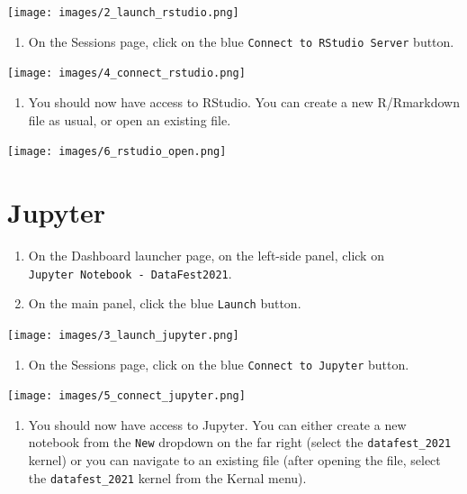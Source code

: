 \documentclass[]{book}
\providecommand{\tightlist}{%
  \setlength{\itemsep}{0pt}\setlength{\parskip}{0pt}}
\begin{document}
\texttt{[image: images/2\_launch\_rstudio.png]}

\begin{enumerate}
\def\labelenumi{\arabic{enumi}.}
\setcounter{enumi}{3}
\tightlist
\item
  On the Sessions page, click on the blue \texttt{Connect\ to\ RStudio\ Server} button.
\end{enumerate}

\texttt{[image: images/4\_connect\_rstudio.png]}

\begin{enumerate}
\def\labelenumi{\arabic{enumi}.}
\setcounter{enumi}{4}
\tightlist
\item
  You should now have access to RStudio. You can create a new R/Rmarkdown file as usual, or open an existing file.
\end{enumerate}

\texttt{[image: images/6\_rstudio\_open.png]}

\hypertarget{jupyter}{%
\section{Jupyter}\label{jupyter}}

\begin{enumerate}
\def\labelenumi{\arabic{enumi}.}
\setcounter{enumi}{1}
\tightlist
\item
  On the Dashboard launcher page, on the left-side panel, click on \texttt{Jupyter\ Notebook\ -\ DataFest2021}.
\item
  On the main panel, click the blue \texttt{Launch} button.
\end{enumerate}

\texttt{[image: images/3\_launch\_jupyter.png]}

\begin{enumerate}
\def\labelenumi{\arabic{enumi}.}
\setcounter{enumi}{3}
\tightlist
\item
  On the Sessions page, click on the blue \texttt{Connect\ to\ Jupyter} button.
\end{enumerate}

\texttt{[image: images/5\_connect\_jupyter.png]}

\begin{enumerate}
\def\labelenumi{\arabic{enumi}.}
\setcounter{enumi}{4}
\tightlist
\item
  You should now have access to Jupyter. You can either create a new notebook from the \texttt{New} dropdown on the far right (select the \texttt{datafest\_2021} kernel) or you can navigate to an existing file (after opening the file, select the \texttt{datafest\_2021} kernel from the Kernal menu).
\end{enumerate}
\end{document}
